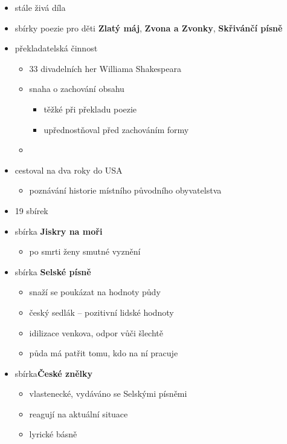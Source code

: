\begin{itemize}
\item stále živá díla
\item sbírky poezie pro děti \textbf{Zlatý máj}, \textbf{Zvona a Zvonky}, \textbf{Skřivánčí písně}
\item překladatelská činnost
	\begin{itemize}
	\item 33 divadelních her Williama Shakespeara
	\item snaha o zachování obsahu
		\begin{itemize}
		\item těžké při překladu poezie
		\item upřednostňoval před zachováním formy
		\end{itemize}
	\item 
	\end{itemize}
\item cestoval na dva roky do USA
	\begin{itemize}
	\item poznávání historie místního původního obyvatelstva
	\end{itemize}
\item 19 sbírek
\item sbírka \textbf{Jiskry na moři}
	\begin{itemize}
	\item po smrti ženy \ra smutné vyznění
	\end{itemize}
\item sbírka \textbf{Selské písně}
	\begin{itemize}
	\item snaží se poukázat na hodnoty půdy
	\item český sedlák -- pozitivní lidské hodnoty
	\item idilizace venkova, odpor vůči šlechtě
	\item půda má patřit tomu, kdo na ní pracuje 
	\end{itemize}
\item sbírka\textbf{České znělky}
	\begin{itemize}
	\item vlastenecké, vydáváno se Selskými písněmi
	\item reagují na aktuální situace
	\item lyrické básně
	\end{itemize}
\end{itemize}

